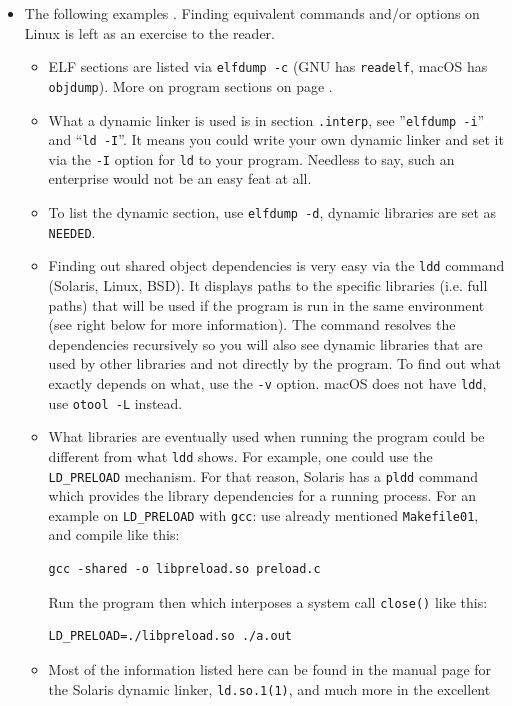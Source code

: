\begin{itemize}
\item The following examples .  Finding equivalent
commands and/or options on Linux is left as an exercise to the reader.
\begin{itemize}
\item ELF sections are listed via \texttt{elfdump -c} (GNU has \texttt{readelf},
macOS has \texttt{objdump}).  More on program sections on page \pageref{ELF}.
\item What a dynamic linker is used is in section \texttt{.interp}, see
''\texttt{elf\-dump -i}'' and ``\texttt{ld -I}''.  It means you could write your
own dynamic linker and set it via the \texttt{-I} option for \texttt{ld} to your
program.  Needless to say, such an enterprise would not be an easy feat at
all.
\item To list the dynamic section, use \texttt{elfdump -d}, dynamic libraries
are set as \texttt{NEEDED}.
\item Finding out shared object dependencies is very easy via the
\texttt{ldd} command (Solaris, Linux, BSD).  It displays paths to the specific
libraries (i.e. full paths) that will be used if the program is run in the
same environment (see right below for more information).  The command resolves
the dependencies recursively so you will also see dynamic libraries that are used
by other libraries and not directly by the program.  To find out what exactly
depends on what, use the \texttt{-v} option.  macOS does not have \texttt{ldd},
use \texttt{otool -L} instead.
\item What libraries are eventually used when running the program could be
different from what \texttt{ldd} shows.  For example, 
one could use the \texttt{LD\_PRELOAD} mechanism.  For that reason,
Solaris has a \texttt{pldd} command which provides the library dependencies for
a running process.  For an example on \texttt{LD\_PRELOAD} with \texttt{gcc}:
use already mentioned \texttt{Ma\-ke\-file01}, and compile
 like this:
\begin{verbatim}
gcc -shared -o libpreload.so preload.c
\end{verbatim}
Run the program then which interposes a system
call \texttt{close()} like this:
\begin{verbatim}
LD_PRELOAD=./libpreload.so ./a.out
\end{verbatim}
\item Most of the information listed here can be found in the manual page for the
Solaris dynamic linker, \texttt{ld.so.1(1)}, and much more in the excellent

\end{itemize}
\end{itemize}
